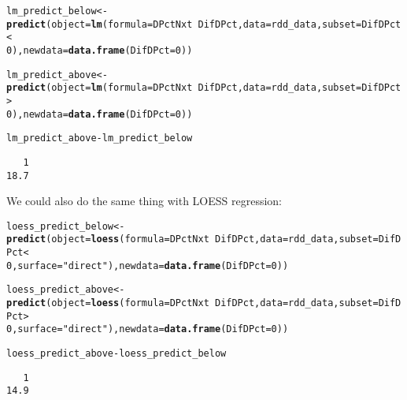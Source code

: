 \documentclass[11pt,leqno]{article}\usepackage[]{graphicx}\usepackage[]{color}
\makeatletter
\newcommand{\hlnum}[1]{\textcolor[rgb]{0.686,0.059,0.569}{#1}}%
\newcommand{\hlstr}[1]{\textcolor[rgb]{0.192,0.494,0.8}{#1}}%
\newcommand{\hlopt}[1]{\textcolor[rgb]{0,0,0}{#1}}%
\newcommand{\hlstd}[1]{\textcolor[rgb]{0.345,0.345,0.345}{#1}}%
\newcommand{\hlkwb}[1]{\textcolor[rgb]{0.69,0.353,0.396}{#1}}%
\newcommand{\hlkwc}[1]{\textcolor[rgb]{0.333,0.667,0.333}{#1}}%
\newcommand{\hlkwd}[1]{\textcolor[rgb]{0.737,0.353,0.396}{\textbf{#1}}}%
\newenvironment{kframe}{%
 \def\at@end@of@kframe{}%
 \ifinner\ifhmode%
  \def\at@end@of@kframe{\end{minipage}}%
  \begin{minipage}{\columnwidth}%
 \fi\fi%
 \def\FrameCommand##1{\hskip\@totalleftmargin \hskip-\fboxsep
 \colorbox{shadecolor}{##1}\hskip-\fboxsep
     \hskip-\linewidth \hskip-\@totalleftmargin \hskip\columnwidth}%
 \MakeFramed {\advance\hsize-\width
   \@totalleftmargin\z@ \linewidth\hsize
   \@setminipage}}%
 {\par\unskip\endMakeFramed%
 \at@end@of@kframe}
\newenvironment{knitrout}{}{} %
\theoremstyle{newstyle}
\makeatother
\begin{document}
\begin{knitrout}\footnotesize
{}\color{fgcolor}\begin{kframe}
\begin{alltt}
\hlstd{lm_predict_below} \hlkwb{<-} \hlkwd{predict}\hlstd{(}\hlkwc{object} \hlstd{=} \hlkwd{lm}\hlstd{(}\hlkwc{formula} \hlstd{= DPctNxt} \hlopt{~} \hlstd{DifDPct,} \hlkwc{data} \hlstd{= rdd_data,} \hlkwc{subset} \hlstd{= DifDPct} \hlopt{<}
    \hlnum{0}\hlstd{),} \hlkwc{newdata} \hlstd{=} \hlkwd{data.frame}\hlstd{(}\hlkwc{DifDPct} \hlstd{=} \hlnum{0}\hlstd{))}

\hlstd{lm_predict_above} \hlkwb{<-} \hlkwd{predict}\hlstd{(}\hlkwc{object} \hlstd{=} \hlkwd{lm}\hlstd{(}\hlkwc{formula} \hlstd{= DPctNxt} \hlopt{~} \hlstd{DifDPct,} \hlkwc{data} \hlstd{= rdd_data,} \hlkwc{subset} \hlstd{= DifDPct} \hlopt{>}
    \hlnum{0}\hlstd{),} \hlkwc{newdata} \hlstd{=} \hlkwd{data.frame}\hlstd{(}\hlkwc{DifDPct} \hlstd{=} \hlnum{0}\hlstd{))}

\hlstd{lm_predict_above} \hlopt{-} \hlstd{lm_predict_below}
\end{alltt}
\begin{verbatim}
   1 
18.7 
\end{verbatim}
\end{kframe}
\end{knitrout}

\newpage
We could also do the same thing with LOESS regression:

\begin{knitrout}\footnotesize
{}\color{fgcolor}\begin{kframe}
\begin{alltt}
\hlstd{loess_predict_below} \hlkwb{<-} \hlkwd{predict}\hlstd{(}\hlkwc{object} \hlstd{=} \hlkwd{loess}\hlstd{(}\hlkwc{formula} \hlstd{= DPctNxt} \hlopt{~} \hlstd{DifDPct,} \hlkwc{data} \hlstd{= rdd_data,} \hlkwc{subset} \hlstd{= DifDPct} \hlopt{<}
    \hlnum{0}\hlstd{,} \hlkwc{surface} \hlstd{=} \hlstr{"direct"}\hlstd{),} \hlkwc{newdata} \hlstd{=} \hlkwd{data.frame}\hlstd{(}\hlkwc{DifDPct} \hlstd{=} \hlnum{0}\hlstd{))}

\hlstd{loess_predict_above} \hlkwb{<-} \hlkwd{predict}\hlstd{(}\hlkwc{object} \hlstd{=} \hlkwd{loess}\hlstd{(}\hlkwc{formula} \hlstd{= DPctNxt} \hlopt{~} \hlstd{DifDPct,} \hlkwc{data} \hlstd{= rdd_data,} \hlkwc{subset} \hlstd{= DifDPct} \hlopt{>}
    \hlnum{0}\hlstd{,} \hlkwc{surface} \hlstd{=} \hlstr{"direct"}\hlstd{),} \hlkwc{newdata} \hlstd{=} \hlkwd{data.frame}\hlstd{(}\hlkwc{DifDPct} \hlstd{=} \hlnum{0}\hlstd{))}

\hlstd{loess_predict_above} \hlopt{-} \hlstd{loess_predict_below}
\end{alltt}
\begin{verbatim}
   1 
14.9 
\end{verbatim}
\end{kframe}
\end{knitrout}
\end{document}
